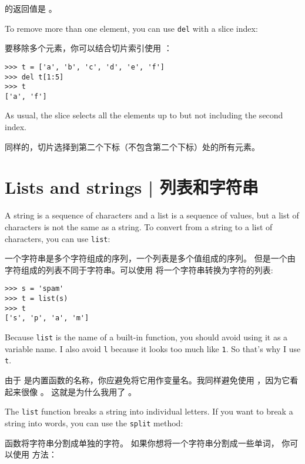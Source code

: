  的返回值是 。

  

To remove more than one element, you can use {\tt del} with
a slice index:

要移除多个元素，你可以结合切片索引使用  ：

\begin{lstlisting}
>>> t = ['a', 'b', 'c', 'd', 'e', 'f']
>>> del t[1:5]
>>> t
['a', 'f']
\end{lstlisting}

%
As usual, the slice selects all the elements up to but not
including the second index.


同样的，切片选择到第二个下标（不包含第二个下标）处的所有元素。


\section{Lists and strings  |  列表和字符串}
  

A string is a sequence of characters and a list is a sequence
of values, but a list of characters is not the same as a
string.  To convert from a string to a list of characters,
you can use {\tt list}:

一个字符串是多个字符组成的序列，一个列表是多个值组成的序列。 但是一个由字符组成的列表不同于字符串。可以使用  将一个字符串转换为字符的列表:

  

\begin{lstlisting}
>>> s = 'spam'
>>> t = list(s)
>>> t
['s', 'p', 'a', 'm']
\end{lstlisting}

%
Because {\tt list} is the name of a built-in function, you should
avoid using it as a variable name.  I also avoid {\tt l} because
it looks too much like {\tt 1}.  So that's why I use {\tt t}.

由于  是内置函数的名称，你应避免将它用作变量名。我同样避免使用  ，因为它看起来很像 。 这就是为什么我用了  。

The {\tt list} function breaks a string into individual letters.  If
you want to break a string into words, you can use the {\tt split}
method:

 函数将字符串分割成单独的字符。 如果你想将一个字符串分割成一些单词， 你可以使用  方法：

